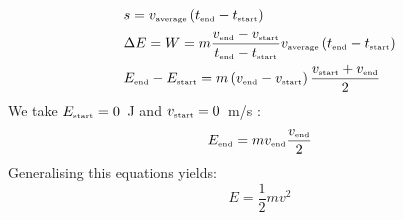 \documentclass[12pt,a4paper]{article}
\numberwithin{equation}{section}
\numberwithin{figure}{section}
\numberwithin{table}{section}
\begin{document}
\begin{align}
& s = v_{\mbox{\begin{tiny}average\end{tiny}}}\left( t_{\mbox{\begin{tiny}end\end{tiny}}} - t_{\mbox{\begin{tiny}start\end{tiny}}} \right) \\
& \Delta E = W = m \frac{v_{\mbox{\begin{tiny}end\end{tiny}}} - v_{\mbox{\begin{tiny}start\end{tiny}}}}{t_{\mbox{\begin{tiny}end\end{tiny}}} - t_{\mbox{\begin{tiny}start\end{tiny}}}} v_{\mbox{\begin{tiny}average\end{tiny}}}\left( t_{\mbox{\begin{tiny}end\end{tiny}}} - t_{\mbox{\begin{tiny}start\end{tiny}}} \right) \\
& E_{\mbox{\begin{tiny}end\end{tiny}}} - E_{\mbox{\begin{tiny}start\end{tiny}}} = m \left( v_{\mbox{\begin{tiny}end\end{tiny}}} - v_{\mbox{\begin{tiny}start\end{tiny}}} \right) \frac{v_{\mbox{\begin{tiny}start\end{tiny}}} + v_{\mbox{\begin{tiny}end\end{tiny}}}}{2}
\end{align}
We take $E_{\mbox{\begin{tiny}start\end{tiny}}}=0$~J and $v_{\mbox{\begin{tiny}start\end{tiny}}}=0$~m/s :
\begin{equation}
E_{\mbox{\begin{tiny}end\end{tiny}}} = m v_{\mbox{\begin{tiny}end\end{tiny}}} \frac{v_{\mbox{\begin{tiny}end\end{tiny}}}}{2}
\end{equation}
Generalising this equations yields:
\begin{equation}
E=\frac{1}{2}mv^2 \label{eq:Ekin}
\end{equation}
\end{document}

